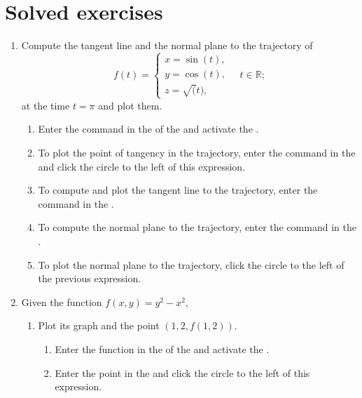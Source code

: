 \section{Solved exercises}
\begin{enumerate}[leftmargin=*]
\item Compute the tangent line and the normal plane to the trajectory of
      \[
      f(t)=
      \begin{cases}
      x=\sin(t), \\
      y=\cos(t), \\
      z=\sqrt(t),
      \end{cases}
      \quad t\in \mathbb{R};
      \]
      at the time $t=\pi$ and plot them.

      \begin{indication}
      \begin{enumerate}
      \item Enter the command  in the  of the  and activate the .
      \item To plot the point of tangency in the trajectory, enter the command  in the  and click the circle to the left of this expression.
      \item To compute and plot the tangent line to the trajectory, enter the command  in the .
      \item To compute the normal plane to the trajectory, enter the command  in the .
      \item To plot the normal plane to the trajectory, click the circle to the left of the previous expression.
      \end{enumerate}
      \end{indication}

\item Given the function $f(x,y)=y^2-x^2$,
      \begin{enumerate}
      \item Plot its graph and the point $(1,2,f(1,2))$.
            \begin{indication}
            \begin{enumerate}
            \item Enter the function  in the  of the  and activate the .
            \item Enter the point  in the  and click the circle to the left of this expression.
            \end{enumerate}
            \end{indication}


\end{enumerate}
\end{enumerate}
